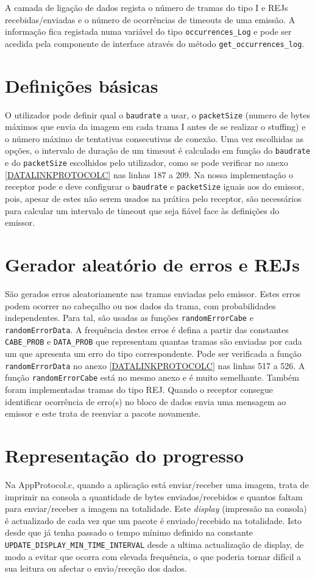 \documentclass[11pt,a4paper,reqno]{report}
\numberwithin{equation}{section}
\begin{document}
A camada de ligação de dados regista o número de tramas do tipo I e REJs recebidas/enviadas e o número de ocorrências de timeouts de uma emissão. A informação fica registada numa variável do tipo \verb|occurrences_Log| e pode ser acedida pela componente de interface através do método \verb|get_occurrences_log|.

\section{Definições básicas}

O utilizador pode definir qual o \verb|baudrate| a usar, o \verb|packetSize| (numero de bytes máximos que envia da imagem em cada trama I antes de se realizar o stuffing) e o número máximo de tentativas consecutivas de conexão.
Uma vez escolhidas as opções, o intervalo de duração de um timeout é calculado em função do \verb|baudrate| e do \verb|packetSize| escolhidos pelo utilizador, como se pode verificar no anexo \ref{DATALINKPROTOCOLC} nas linhas 187 a 209. Na nossa implementação o receptor pode e deve configurar o \verb|baudrate| e \verb|packetSize| iguais aos do emissor, pois, apesar de estes não serem usados na prática pelo receptor, são necessários para calcular um intervalo de timeout que seja fiável face às definições do emissor.

\section{Gerador aleatório de erros e REJs}
São gerados erros aleatoriamente nas tramas enviadas pelo emissor. Estes erros podem ocorrer no cabeçalho ou nos dados da trama, com probabilidades independentes. Para tal, são usadas as funções \verb|randomErrorCabe| e \verb|randomErrorData|. A frequência destes erros é defina a partir das constantes \verb|CABE_PROB| e \verb|DATA_PROB| que representam quantas tramas são enviadas por cada um que apresenta um erro do tipo correspondente. Pode ser verificada a função \verb|randomErrorData| no anexo \ref{DATALINKPROTOCOLC} nas linhas 517 a 526. A função \verb|randomErrorCabe| está no mesmo anexo e é muito semelhante.
Também foram implementadas tramas do tipo REJ. Quando o receptor consegue identificar ocorrência de erro(s) no bloco de dados envia uma mensagem ao emissor e este trata de reenviar a pacote novamente.

\section{Representação do progresso}
Na AppProtocol.c, quando a aplicação está enviar/receber uma imagem, trata de imprimir na consola a quantidade de bytes enviados/recebidos e quantos faltam para enviar/receber a imagem na totalidade. Este \emph{display} (impressão na consola) é actualizado de cada vez que um pacote é enviado/recebido na totalidade. Isto desde que já tenha passado o tempo mínimo definido na constante \verb|UPDATE_DISPLAY_MIN_TIME_INTERVAL| desde a ultima actualização de display, de modo a evitar que ocorra com elevada frequência, o que poderia tornar difícil a sua leitura ou afectar o envio/receção dos dados.
\end{document}
